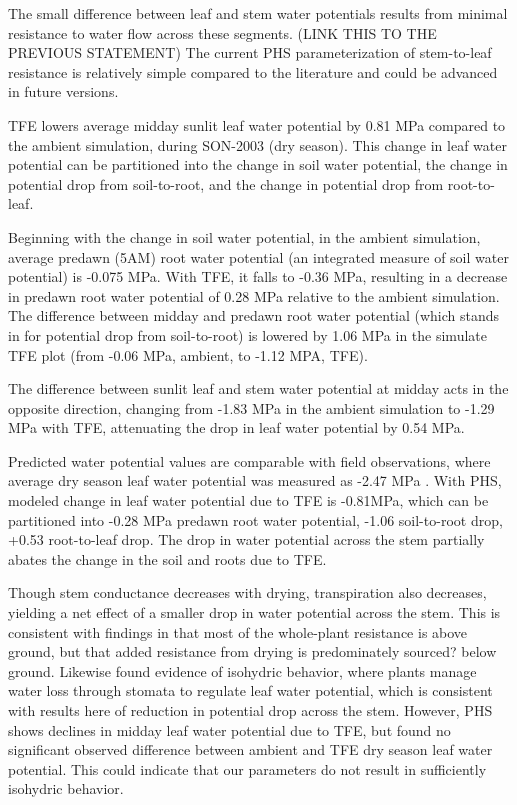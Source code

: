 \documentclass[draft,linenumbers]{agujournal}
\begin{document}
    The small difference between leaf and stem water potentials results from minimal resistance to water flow across these segments. (LINK THIS TO THE PREVIOUS STATEMENT) The current PHS parameterization of stem-to-leaf resistance is relatively simple compared to the literature \citep{franks2007} and could be advanced in future versions. 
    
    TFE lowers average midday sunlit leaf water potential by 0.81 MPa compared to the ambient simulation, during SON-2003 (dry season). This change in leaf water potential can be partitioned into the change in soil water potential, the change in potential drop from soil-to-root, and the change in potential drop from root-to-leaf. 
    
    Beginning with the change in soil water potential, in the ambient simulation, average predawn (5AM) root water potential (an integrated measure of soil water potential) is -0.075 MPa. With TFE, it falls to -0.36 MPa, resulting in a decrease in predawn root water potential of 0.28 MPa relative to the ambient simulation. The difference between midday and predawn root water potential (which stands in for potential drop from soil-to-root) is lowered by 1.06 MPa in the simulate TFE plot (from -0.06 MPa, ambient, to -1.12 MPA, TFE).
    
    The difference between sunlit leaf and stem water potential at midday acts in the opposite direction, changing from -1.83 MPa in the ambient simulation to -1.29 MPa with TFE, attenuating the drop in leaf water potential by 0.54 MPa.
    
    Predicted water potential values are comparable with field observations, where average dry season leaf water potential was measured as -2.47 MPa \citep{fisher2006}. With PHS, modeled change in leaf water potential due to TFE is -0.81MPa, which can be partitioned into -0.28 MPa predawn root water potential, -1.06 soil-to-root drop, +0.53 root-to-leaf drop. The drop in water potential across the stem partially abates the change in the soil and roots due to TFE. 
    
    Though stem conductance decreases with drying, transpiration also decreases, yielding a net effect of a smaller drop in water potential across the stem. This is consistent with findings in \cite{fisher2006} that most of the whole-plant resistance is above ground, but that added resistance from drying is predominately sourced? below ground. Likewise \cite{fisher2006} found evidence of isohydric behavior, where plants manage water loss through stomata to regulate leaf water potential, which is consistent with results here of reduction in potential drop across the stem. However, PHS shows declines in midday leaf water potential due to TFE, but \cite{fisher2006} found no significant observed difference between ambient and TFE dry season leaf water potential. This could indicate that our parameters do not result in sufficiently isohydric behavior.
    
\end{document}
